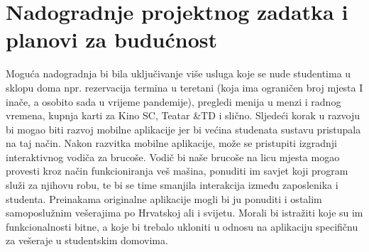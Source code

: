 		\section{Nadogradnje projektnog zadatka i planovi za budućnost}
		
			{Moguća nadogradnja bi bila uključivanje više usluga koje se nude studentima u sklopu doma npr.
			rezervacija termina u teretani (koja ima ograničen broj mjesta I inače, a osobito sada u vrijeme
			pandemije), pregledi menija u menzi i radnog vremena, kupnja karti za Kino SC, Teatar \&TD i slično.
			Sljedeći korak u razvoju bi mogao biti razvoj mobilne aplikacije jer bi većina studenata sustavu pristupala
			na taj način. Nakon razvitka mobilne aplikacije, može se pristupiti izgradnji interaktivnog vodiča za
			brucoše. Vodič bi naše brucoše na licu mjesta mogao provesti kroz način funkcioniranja veš mašina,
			ponuditi im savjet koji program služi za njihovu robu, te bi se time smanjila interakcija između
			zaposlenika i studenta.
			Preinakama originalne aplikacije mogli bi ju ponuditi i ostalim samoposlužnim vešerajima po Hrvatskoj
			ali i svijetu. Morali bi istražiti koje su im funkcionalnosti bitne, a koje bi trebalo ukloniti u odnosu na
			aplikaciju specifičnu za vešeraje u studentskim domovima.}